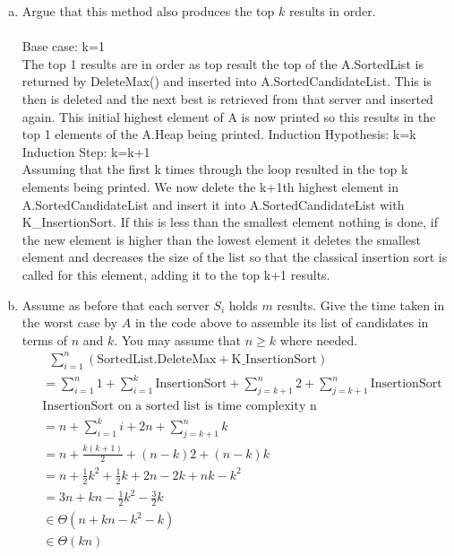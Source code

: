 \documentclass[12pt]{article}
\begin{document}
\begin{enumerate}[(a)]
\setcounter{enumi}{\value{saveenum}}
\item Argue that this method also produces the top $k$ results in order.\\\\
Base case: k=1\\
    The top 1 results are in order as  top result the top of the A.SortedList is returned by DeleteMax() and inserted into A.SortedCandidateList. This is then is deleted and the next best is retrieved from that server and inserted again. This initial highest element of A is now printed so this results in the top 1 elements of the A.Heap being printed.
Induction Hypothesis: k=k\\
Induction Step: k=k+1\\
    Assuming that the first k times through the loop resulted in the top k elements being printed. We now delete the k+1th highest element in A.SortedCandidateList and insert it into A.SortedCandidateList with K\_InsertionSort. If this is less than the smallest element nothing is done, if the new element is higher than the lowest element it deletes the smallest element and decreases the size of the list so that the classical insertion sort is called for this element, adding it to the top k+1 results.
\item Assume as before that each server $S_i$ holds $m$ results. Give the time taken in the worst
case by $A$ in the code above to assemble its list of candidates in terms of $n$ and $k$. You may assume that $n\geq k$ where needed.
\begin{align*}
&\enspace \displaystyle\sum_{i=1}^n (\text{SortedList.DeleteMax} + \text{K\_InsertionSort})\\
&= \displaystyle\sum_{i=1}^n 1 + \displaystyle\sum_{i=1}^k \text{InsertionSort} + \displaystyle\sum_{j=k+1}^{n}2 + \displaystyle\sum_{j=k+1}^{n}\text{InsertionSort}\\
&\text{InsertionSort on a sorted list is time complexity n}\\
&= n + \displaystyle\sum_{i=1}^k i  + 2n + \displaystyle\sum_{j=k+1}^{n}k\\
&= n + \frac{k(k+1)}{2} + (n-k)2 +  (n-k)k\\
&= n + \frac{1}{2}k^2 +\frac{1}{2}k + 2n -2k +nk- k^2\\
&= 3n + kn -\frac{1}{2} k^2 -\frac{3}{2}k \\
& \in \Theta(n + kn -k^2 -k)\\
& \in \Theta(kn)
\end{align*}

\end{enumerate}
\end{document}
